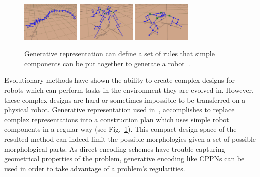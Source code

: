 \begin{figure}[h!]
\centering
\includegraphics[width=0.25\textwidth,height=0.2\textwidth]{../Figures/Misc/rules1.png}
\includegraphics[width=0.25\textwidth,height=0.2\textwidth]{../Figures/Misc/rules2.png}
\includegraphics[width=0.25\textwidth,height=0.2\textwidth]{../Figures/Misc/rules3.png}
\caption{Generative representation can define a set of rules that simple components can be put together to generate a robot~\citep{hornby2003generative}.}
\label{fig:rules}
\end{figure}

Evolutionary methods have shown the ability to create complex designs for robots which can perform tasks in the environment they are evolved in. However, these complex designs are hard or sometimes impossible to be transferred on a physical robot. Generative representation used in~\citep{hornby2003generative}, accomplishes to replace complex representations into a construction plan which uses simple robot components in a regular way (see Fig.~\ref{fig:rules}). This compact design space of the resulted method can indeed limit the possible morphologies given a set of possible morphological parts. As direct encoding schemes have trouble capturing geometrical properties of the problem, generative encoding like CPPNs can be used in order to take advantage of a problem's regularities.

